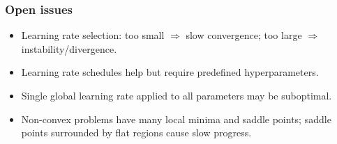 \subsubsection*{Open issues}
\begin{itemize}
    \item Learning rate selection: too small $\Rightarrow$ slow convergence; too large $\Rightarrow$ instability/divergence.
    \item Learning rate schedules help but require predefined hyperparameters.
    \item Single global learning rate applied to all parameters may be suboptimal.
    \item Non-convex problems have many local minima and saddle points; saddle points surrounded by flat regions cause slow progress.
\end{itemize}

